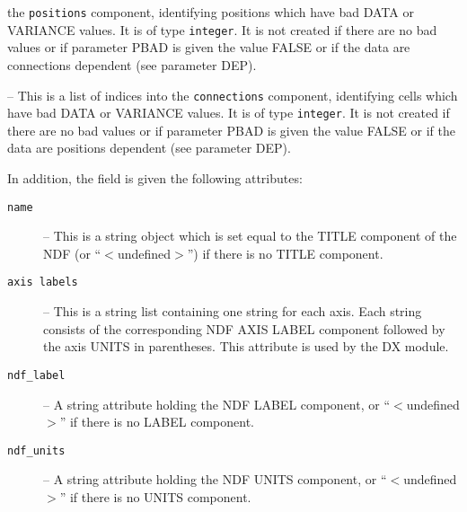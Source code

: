 {{\begin{description}
      the {\tt positions} component, identifying positions which have bad 
      DATA or VARIANCE values. It is of type {\tt integer}. It is not
      created if there are no bad values or if parameter PBAD is given
      the value FALSE or if the data are connections dependent (see
      parameter DEP).
      \item [{\tt invalid connections}] -- This is a list of indices into
      the {\tt connections} component, identifying cells which have bad 
      DATA or VARIANCE values. It is of type {\tt integer}. It is not
      created if there are no bad values or if parameter PBAD is given
      the value FALSE or if the data are positions dependent (see
      parameter DEP).
      \end{description}

      In addition, the field is given the following attributes:
      \begin{description}
      \item [{\tt name}] -- This is a string object which is set equal to
      the TITLE component of the NDF (or ``$<$undefined$>$'') if there is no TITLE
      component.
      \item [{\tt axis labels}] -- This is a string list containing one
      string for each axis. Each string consists of the corresponding NDF AXIS 
      LABEL component followed by the axis UNITS in parentheses. This
      attribute is used by the DX  module.
      \item [{\tt ndf\_label}] -- A string attribute holding the NDF LABEL
      component, or ``$<$undefined$>$'' if there is no LABEL component.
      \item [{\tt ndf\_units}] -- A string attribute holding the NDF UNITS
      component, or ``$<$undefined$>$'' if there is no UNITS component.
      \end{description}
      

}}
